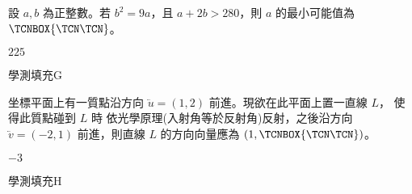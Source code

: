 \begin{QUESTIONS}
\begin{QUESTION}
\begin{QBODY}
            設 $a ,b$ 為正整數。若 $b^2 =9a$，且 $a+2b>280$，則 $a$ 的最小可能值為 
$\TCNBOX{\TCN\TCN}$。
        \end{QBODY}
        \begin{QFROMS}
        \end{QFROMS}
        \begin{QTAGS}\end{QTAGS}
        \begin{QANS}
            $225$
        \end{QANS}
        \begin{QSOLLIST}
        \end{QSOLLIST}
        \begin{QEMPTYSPACE}
        \end{QEMPTYSPACE}
    \end{QUESTION}
    \begin{QUESTION}
        \begin{ExamInfo}{97}{學測}{填充}{G}
        \end{ExamInfo}
        \begin{ExamAnsRateInfo}{30}{65}{19}{6}
        \end{ExamAnsRateInfo}
        \begin{QBODY}
            坐標平面上有一質點沿方向 $\lvec{u} = (1, 2)$ 前進。現欲在此平面上置一直線 $L$，
			使得此質點碰到 $L$ 時 依光學原理(入射角等於反射角)反射，之後沿方向 $\lvec{v} = (-2, 1)$ 前進，則直線 $L$ 的方向向量應為 $(1, 
			\TCNBOX{\TCN\TCN})$。
        \end{QBODY}
        \begin{QFROMS}
        \end{QFROMS}
        \begin{QTAGS}\end{QTAGS}
        \begin{QANS}
            $-3$
        \end{QANS}
        \begin{QSOLLIST}
        \end{QSOLLIST}
        \begin{QEMPTYSPACE}
        \end{QEMPTYSPACE}
    \end{QUESTION}
    \begin{QUESTION}
        \begin{ExamInfo}{97}{學測}{填充}{H}
        \end{ExamInfo}
        \begin{ExamAnsRateInfo}{10}{29}{1}{0}

\end{ExamAnsRateInfo}
\end{QUESTION}
\end{QUESTIONS}

